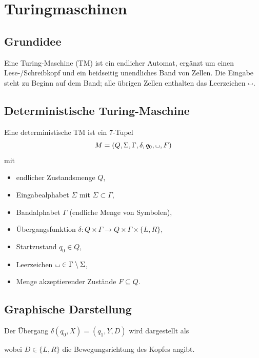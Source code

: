 \section{Turingmaschinen}

\subsection{Grundidee}
Eine Turing-Maschine (TM) ist ein endlicher Automat, ergänzt um einen Lese-/Schreibkopf und ein beidseitig unendliches Band von Zellen.
Die Eingabe steht zu Beginn auf dem Band; alle übrigen Zellen enthalten das Leerzeichen \(\shortsqcup\).

\subsection{Deterministische Turing-Maschine}
Eine deterministische TM ist ein 7-Tupel
\[
    M = (Q, \Sigma, \Gamma, \delta, q_0, \shortsqcup, F)
\]
mit
\begin{itemize}
    \item endlicher Zustandsmenge \(Q\),
    \item Eingabealphabet \(\Sigma\) mit \(\Sigma \subset \Gamma\),
    \item Bandalphabet \(\Gamma\) (endliche Menge von Symbolen),
    \item Übergangsfunktion \(\delta : Q \times \Gamma \to Q \times \Gamma \times \{L, R\}\),
    \item Startzustand \(q_0 \in Q\),
    \item Leerzeichen \(\shortsqcup \in \Gamma \setminus \Sigma\),
    \item Menge akzeptierender Zustände \(F \subseteq Q\).
\end{itemize}

\subsection{Graphische Darstellung}
Der Übergang \(\delta(q_0, X) = (q_1, Y, D)\) wird dargestellt als\\
\begin{center}
\end{center}
wobei \(D \in \{L, R\}\) die Bewegungsrichtung des Kopfes angibt.

